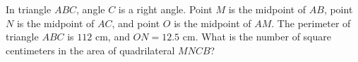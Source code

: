 In triangle $ABC$, angle $C$ is a right angle. Point $M$ is the midpoint of $AB$, point $N$ is the midpoint of $AC$, and point $O$ is the midpoint of $AM$. The perimeter of triangle $ABC$ is $112$ cm, and $ON=12.5$ cm. What is the number of square centimeters in the area of quadrilateral $MNCB$?

